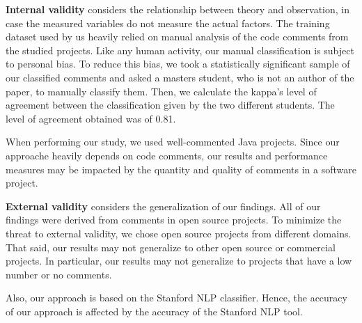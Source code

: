 \noindent\textbf{Internal validity} considers the relationship between theory and observation, in case the measured variables do not measure the actual factors. The training dataset used by us heavily relied on manual analysis of the code comments from the studied projects. Like any human activity, our manual classification is subject to personal bias. To reduce this bias, we took a statistically significant sample of our classified comments and asked a masters student, who is not an author of the paper, to manually classify them. Then, we calculate the kappa's level of agreement between the classification given by the two different students. The level of agreement obtained was of 0.81.  

When performing our study, we used well-commented Java projects. Since our approache heavily depends on code comments, our results and performance measures may be impacted by the quantity and quality of comments in a software project.  

\noindent \textbf{External validity} considers the generalization of our findings. All of our findings were derived from comments in open source projects. To minimize the threat to external validity, we chose open source projects from different domains. That said, our results may not generalize to other open source or commercial projects. In particular, our results may not generalize to projects that have a low number or no comments.

Also, our approach is based on the Stanford NLP classifier. Hence, the accuracy of our approach is affected by the accuracy of the Stanford NLP tool. 